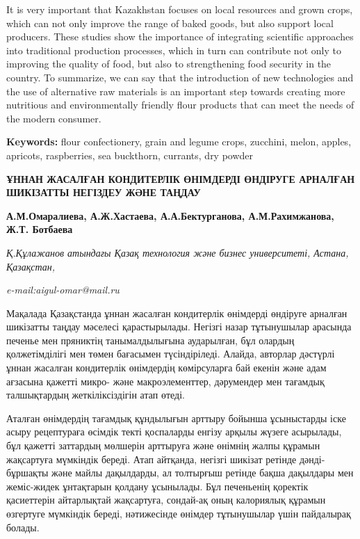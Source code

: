 It is very important that Kazakhstan focuses on local resources and
grown crops, which can not only improve the range of baked goods, but
also support local producers. These studies show the importance of
integrating scientific approaches into traditional production processes,
which in turn can contribute not only to improving the quality of food,
but also to strengthening food security in the country. To summarize, we
can say that the introduction of new technologies and the use of
alternative raw materials is an important step towards creating more
nutritious and environmentally friendly flour products that can meet the
needs of the modern consumer.

{\bfseries Keywords:} flour confectionery, grain and legume crops,
zucchini, melon, apples, apricots, raspberries, sea buckthorn, currants,
dry powder

\begin{articleheader}
{\bfseries ҰННАН ЖАСАЛҒАН КОНДИТЕРЛІК ӨНІМДЕРДІ ӨНДІРУГЕ АРНАЛҒАН ШИКІЗАТТЫ НЕГІЗДЕУ ЖӘНЕ ТАҢДАУ}

{\bfseries
А.М.Омаралиева\textsuperscript{\envelope },
А.Ж.Хастаева,
А.А.Бектурганова,
А.М.Рахимжанова,
Ж.Т. Ботбаева}
\end{articleheader}

\begin{affiliation}
\emph{Қ.Құлажанов атындағы Қазақ технология және бизнес университеті, Астана, Қазақстан,}

\emph{e-mail:aigul-omar@mail.ru}
\end{affiliation}

Мақалада Қазақстанда ұннан жасалған кондитерлік өнімдерді өндіруге
арналған шикізатты таңдау мәселесі қарастырылады. Негізгі назар
тұтынушылар арасында печенье мен пряниктің танымалдылығына аударылған,
бұл олардың қолжетімділігі мен төмен бағасымен түсіндіріледі. Алайда,
авторлар дәстүрлі ұннан жасалған кондитерлік өнімдердің көмірсуларға бай
екенін және адам ағзасына қажетті микро- және макроэлементтер,
дәрумендер мен тағамдық талшықтардың жеткіліксіздігін атап өтеді.

Аталған өнімдердің тағамдық құндылығын арттыру бойынша ұсыныстарды іске
асыру рецептураға өсімдік текті қоспаларды енгізу арқылы жүзеге
асырылады, бұл қажетті заттардың мөлшерін арттыруға және өнімнің жалпы
құрамын жақсартуға мүмкіндік береді. Атап айтқанда, негізгі шикізат
ретінде дәнді-бұршақты және майлы дақылдарды, ал толтырғыш ретінде бақша
дақылдары мен жеміс-жидек ұнтақтарын қолдану ұсынылады. Бұл печеньенің
қоректік қасиеттерін айтарлықтай жақсартуға, сондай-ақ оның калориялық
құрамын өзгертуге мүмкіндік береді, нәтижесінде өнімдер тұтынушылар үшін
пайдалырақ болады.

